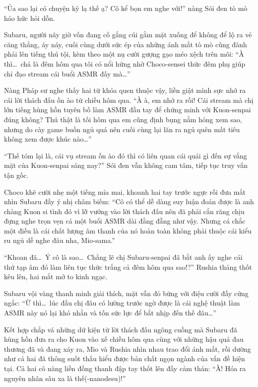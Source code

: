 \documentclass[../main.tex]{subfiles}
\begin{document}
``Ủa sao lại có chuyện kỳ lạ thế ạ? Cô kể bọn em nghe với!'' nàng Sói đen tò mò háo hức hỏi dồn.

Subaru, người nãy giờ vốn đang cố gắng cúi gằm mặt xuống để không để lộ ra vẻ căng thẳng, áy náy, cuối cùng dưới sức ép của những ánh mắt tò mò cũng đành phải lên tiếng thú tội, kèm theo một nụ cười gượng gạo méo xệch trên môi: ``À thì\dots\ chả là đêm hôm qua tôi có nổi hứng nhờ Choco-sensei thức đêm phụ giúp chỉ đạo stream cái buổi ASMR đấy mà\dots''

Nàng Pháp sư nghe thấy hai từ khóa quen thuộc vậy, liền giật mình sực nhớ ra cái lời thách đấu ồn ào từ chiều hôm qua. ``À à, em nhớ ra rồi! Cái stream mà chị lớn tiếng hùng hồn tuyên bố làm ASMR đầu tay để chứng minh với Kuon-senpai đúng không? Thú thật là tối hôm qua em cũng định bụng nằm hóng xem sao, nhưng do cày game buồn ngủ quá nên cuối cùng lại lăn ra ngủ quên mất tiêu không xem được khúc nào\dots''

``Thế tóm lại là, cái vụ stream ồn ào đó thì có liên quan cái quái gì đến sự vắng mặt của Kuon-senpai sáng nay?'' Sói đen vẫn không cam tâm, tiếp tục truy vấn tận gốc.

Choco khẽ cười nhẹ một tiếng mỉa mai, khoanh hai tay trước ngực rồi đưa mắt nhìn Subaru đầy ý nhị châm biếm: ``Cô có thể dễ dàng suy luận đoán được là anh chàng Kuon si tình đó vì lỡ vướng vào lời thách đấu nên đã phải cắn răng chịu đựng nghe trọn vẹn cả một buổi ASMR dài đằng đẵng như vậy. Nhưng cá chắc một điều là cái chất lượng âm thanh của nó hoàn toàn không phải thuộc cái kiểu ru ngủ dễ nghe đâu nha, Mio-sama.''

``Khoan đã\dots\ Ý cô là sao\dots\ Chẳng lẽ chị Subaru-senpai đã bắt anh ấy nghe cái thứ tạp âm đó làm liên tục thức trắng cả đêm hôm qua sao!?'' Rushia thảng thốt kêu lên, hai mắt mở to kinh ngạc.

Subaru vội vàng thanh minh giải thích, mặt vẫn đỏ bừng với điệu cười đầy cứng ngắc: ``Ừ thì\dots\ lúc đầu chị đâu có lường trước ngờ được là cái nghệ thuật làm ASMR này nó lại khó nhằn và tốn sức lực để bắt nhịp đến thế đâu\dots''

Kết hợp chắp vá những dữ kiện từ lời thách đấu ngông cuồng mà Subaru đã hùng hồn đưa ra cho Kuon vào xế chiều hôm qua cùng với những hậu quả đau thương đã và đang xảy ra, Mio và Rushia nhìn nhau trao đổi ánh mắt, rồi dường như cả hai đã thông suốt thấu hiểu được bản chất ngọn ngành của vấn đề hiện tại. Cả hai cô nàng liền đồng thanh đập tay thốt lên đầy cảm thán: ``À! Hóa ra nguyên nhân sâu xa là thế(-nanodesu)!''
\end{document}
